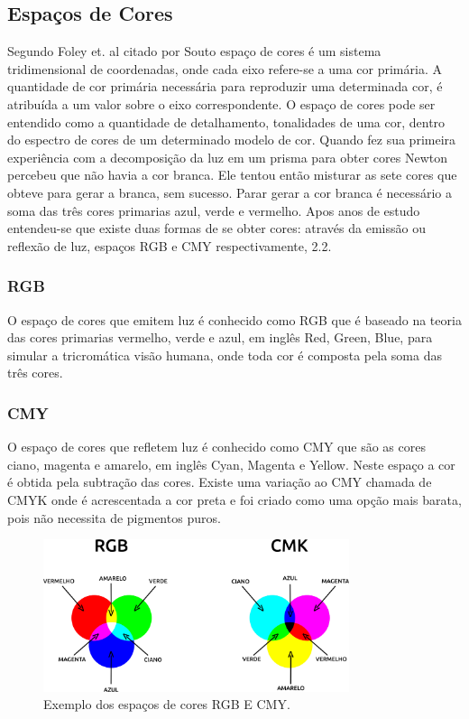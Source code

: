 \subsection{Espaços de Cores}
Segundo Foley et. al citado por Souto\cite{Souto:2003} espaço de cores é um sistema tridimensional de
coordenadas, onde cada eixo refere-se a uma cor primária. A quantidade de cor primária
necessária para reproduzir uma determinada cor, é atribuída a um valor sobre o eixo
correspondente. O espaço de cores pode ser entendido como a quantidade de detalhamento, tonalidades de uma cor, dentro do espectro de cores de um determinado modelo de cor. 
Quando fez sua primeira experiência com a decomposição da luz em um prisma para obter cores Newton percebeu que não havia a cor branca. Ele tentou então misturar as sete cores que obteve para gerar a branca, sem sucesso. Parar gerar a cor branca é necessário a soma das três cores primarias azul, verde e vermelho. Apos anos de estudo entendeu-se que existe duas formas de se obter cores: através da emissão ou reflexão de luz, espaços RGB e CMY respectivamente, \figurename{ 2.2}. 

\subsubsection{RGB}
O espaço de cores que emitem luz é conhecido como RGB que é baseado na teoria das cores primarias vermelho, verde e azul, em inglês Red, Green, Blue, para simular a tricromática visão humana, onde toda cor é composta pela soma das três cores.
\subsubsection{CMY}
O espaço de cores que refletem luz é conhecido como CMY que são as cores ciano, magenta e amarelo, em inglês Cyan, Magenta e Yellow. Neste espaço a cor é obtida pela subtração das cores. Existe uma variação ao CMY chamada de CMYK onde é acrescentada a cor preta e foi criado 	como uma opção mais barata, pois não necessita de pigmentos puros\cite{Rocha:2010}.
\newline
\begin{figure}[!h]
	\centering
	\includegraphics[width=0.8\textwidth]{espacos.pdf}
	\caption{Exemplo dos espaços de cores RGB E CMY.}
	\label{Espaco de Cores}
\end{figure}
